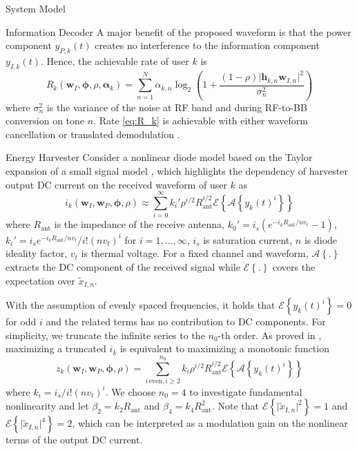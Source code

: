 \documentclass{IEEEtran}
\begin{document}
\begin{section}{System Model}
	\begin{subsection}{Information Decoder}
		A major benefit of the proposed waveform is that the power component $y_{P,k}(t)$ creates no interference to the information component $y_{I,k}(t)$. Hence, the achievable rate of user $k$ is
		\begin{equation}\label{eq:R_k}
			R_k(\boldsymbol{w}_I,\boldsymbol{\phi},\rho,\boldsymbol{\alpha}_k)=\sum_{n=1}^N\alpha_{k,n}{\log_2\left(1+\frac{(1-\rho)\lvert \boldsymbol{h}_{k,n}\boldsymbol{w}_{I,n} \rvert^2}{\sigma_n^2}\right)}
		\end{equation}
		where $\sigma_n^2$ is the variance of the noise at RF band and during RF-to-BB conversion on tone $n$. Rate \ref{eq:R_k} is achievable with either waveform cancellation or translated demodulation \cite{Clerckx2018b}.
	\end{subsection}

	\begin{subsection}{Energy Harvester}
		Consider a nonlinear diode model based on the Taylor expansion of a small signal model \cite{Clerckx2016a,Clerckx2018b}, which highlights the dependency of harvester output DC current on the received waveform of user $k$ as
		\begin{equation}\label{eq:i_k}
			i_k(\boldsymbol{w}_I,\boldsymbol{w}_P,\boldsymbol{\phi},\rho)\approx\sum_{i=0}^{\infty}{k_i'}{\rho^{i/2}}{R_{\text{ant}}^{i/2}}\mathcal{E}\left\{{\mathcal{A}\left\{y_k(t)^i\right\}}\right\}
		\end{equation}
		where $R_{\text{ant}}$ is the impedance of the receive antenna, $k_0'=i_s(e^{-i_kR_{\text{ant}}/nv_t}-1)$, $k_i'=i_se^{-i_kR_{\text{ant}}/nv_t}/i!(nv_t)^i$ for $i=1,\dots,\infty$, $i_s$ is saturation current, $n$ is diode ideality factor, $v_t$ is thermal voltage. For a fixed channel and waveform, $\mathcal{A}\left\{.\right\}$ extracts the DC component of the received signal while $\mathcal{E}\left\{.\right\}$ covers the expectation over $\tilde{x}_{I,n}$.

		With the assumption of evenly spaced frequencies, it holds that $\mathcal{E}\left\{y_k(t)^i\right\}=0$ for odd $i$ and the related terms has no contribution to DC components. For simplicity, we truncate the infinite series to the $n_0$-th order. As proved in \cite{Clerckx2016a}, maximizing a truncated $i_k$ is equivalent to maximizing a monotonic function
		\begin{equation}\label{eq:z_k}
			z_k(\boldsymbol{w}_I,\boldsymbol{w}_P,\boldsymbol{\phi},\rho)=\sum_{i\,\text{even},i\ge2}^{n_0}{k_i}{\rho^{i/2}}{R_{\text{ant}}^{i/2}}{\mathcal{E}\left\{\mathcal{A}\left\{y_k(t)^i\right\}\right\}}
		\end{equation}
		where $k_i=i_s/i!(nv_t)^i$. We choose $n_0=4$ to investigate fundamental nonlinearity and let $\beta_2={k_2}{R_{\text{ant}}}$ and $\beta_4={k_4}{R_{\text{ant}}^2}$. Note that $\mathcal{E}\left\{\lvert\tilde{x}_{I,n}\rvert^2\right\}=1$ and $\mathcal{E}\left\{\lvert\tilde{x}_{I,n}\rvert^4\right\}=2$, which can be interpreted as a modulation gain on the nonlinear terms of the output DC current.


\end{subsection}
\end{section}
\end{document}
